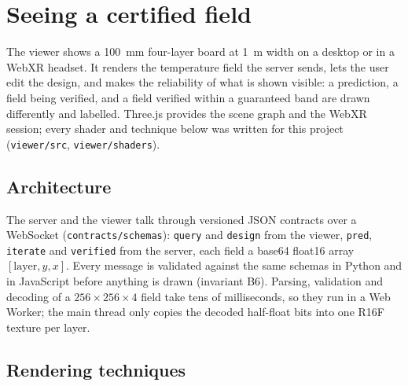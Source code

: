 
\chapter{Seeing a certified field}
\label{ch:cgvr}

The viewer shows a 100~mm four-layer board at 1~m width on a desktop or in a WebXR headset. It
renders the temperature field the server sends, lets the user edit the design, and makes the
reliability of what is shown visible: a prediction, a field being verified, and a field verified
within a guaranteed band are drawn differently and labelled. Three.js provides the scene graph and
the WebXR session; every shader and technique below was written for this project
(\texttt{viewer/src}, \texttt{viewer/shaders}).

\section{Architecture}
The server and the viewer talk through versioned JSON contracts over a WebSocket
(\texttt{contracts/schemas}): \texttt{query} and \texttt{design} from the viewer, \texttt{pred},
\texttt{iterate} and \texttt{verified} from the server, each field a base64 float16 array
$[\text{layer},y,x]$. Every message is validated against the same schemas in Python and in
JavaScript before anything is drawn (invariant B6). Parsing, validation and decoding of a
$256\times256\times4$ field take tens of milliseconds, so they run in a Web Worker; the main
thread only copies the decoded half-float bits into one R16F texture per layer.

\section{Rendering techniques}
